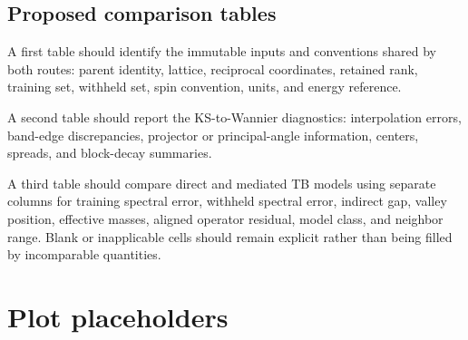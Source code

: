 \subsection{Proposed comparison tables}

A first table should identify the immutable inputs and conventions shared by
both routes: parent identity, lattice, reciprocal coordinates, retained rank,
training set, withheld set, spin convention, units, and energy reference.

A second table should report the KS-to-Wannier diagnostics: interpolation
errors, band-edge discrepancies, projector or principal-angle information,
centers, spreads, and block-decay summaries.

A third table should compare direct and mediated TB models using separate
columns for training spectral error, withheld spectral error, indirect gap,
valley position, effective masses, aligned operator residual, model class, and
neighbor range. Blank or inapplicable cells should remain explicit rather than
being filled by incomparable quantities.

\section{Plot placeholders}

